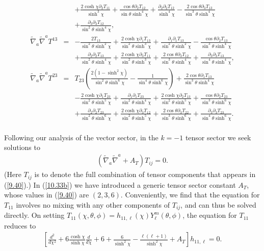 \begin{eqnarray}
 \nonumber\\
 &&+ \frac{2 \cosh\chi \partial_{2}T_{11}}{\sinh^3\chi}  + \frac{\cos\theta \partial_{2}T_{12}}{\sin\theta \sinh^4\chi} + \frac{\partial_{2}\partial_{2}T_{12}}{\sinh^4\chi}
 -  \frac{2 \cos\theta \partial_{3}T_{13}}{\sin^3\theta \sinh^4\chi}
 \nonumber\\
 && + \frac{\partial_{3}\partial_{3}T_{12}}{\sin^2\theta \sinh^4\chi},
\nonumber\\ 
\tilde{\nabla}_a\tilde{\nabla}^aT^{13}&=& - \frac{2 T_{13}}{\sin^2\theta \sinh^2\chi} + \frac{2 \cosh\chi \partial_{1}T_{13}}{\sin^2\theta \sinh^3\chi} + \frac{\partial_{1}\partial_{1}T_{13}}{\sin^2\theta \sinh^2\chi} -  \frac{\cos\theta \partial_{2}T_{13}}{\sin^3\theta \sinh^4\chi}
\nonumber\\
&& + \frac{\partial_{2}\partial_{2}T_{13}}{\sin^2\theta \sinh^4\chi}  + \frac{2 \cosh\chi \partial_{3}T_{11}}{\sin^2\theta \sinh^3\chi} + \frac{2 \cos\theta \partial_{3}T_{12}}{\sin^3\theta \sinh^4\chi} + \frac{\partial_{3}\partial_{3}T_{13}}{\sin^4\theta \sinh^4\chi},
\nonumber\\ 
\tilde{\nabla}_a\tilde{\nabla}^aT^{23}&=& T_{23} \left(\frac{2(1-\sinh^2\chi)}{\sin^2\theta\sinh^6\chi} -  \frac{1}{\sin^4\theta \sinh^6\chi}\right) + \frac{2 \cos\theta \partial_{1}T_{13}}{\sin^3\theta \sinh^4\chi} 
\nonumber\\
&&-  \frac{2 \cosh\chi \partial_{1}T_{23}}{\sin^2\theta \sinh^5\chi} + \frac{\partial_{1}\partial_{1}T_{23}}{\sin^2\theta \sinh^4\chi} + \frac{2 \cosh\chi \partial_{2}T_{13}}{\sin^2\theta \sinh^5\chi} + \frac{\cos\theta \partial_{2}T_{23}}{\sin^3\theta \sinh^6\chi} 
\nonumber\\
&&+ \frac{\partial_{2}\partial_{2}T_{23}}{\sin^2\theta \sinh^6\chi} + \frac{2 \cosh\chi \partial_{3}T_{12}}{\sin^2\theta \sinh^5\chi} + \frac{2 \cos\theta \partial_{3}T_{22}}{\sin^3\theta \sinh^6\chi} 
 + \frac{\partial_{3}\partial_{3}T_{23}}{\sin^4\theta \sinh^6\chi}.
 \nonumber\\
\label{10.32b}
\end{eqnarray}
%

Following our analysis of the vector sector, in the $k=-1$ tensor sector we seek solutions to
%
\begin{eqnarray}
(\tilde{\nabla}_a\tilde{\nabla}^a+A_T)T_{ij}=0.
\label{10.33b}
\end{eqnarray}
%
(Here $T_{ij}$ is to denote the full combination of  tensor components that appears in (\ref{9.40}).)  In (\ref{10.33b}) we have introduced a generic tensor sector constant $A_T$, whose values in (\ref{9.40})  are $(2,3,6)$.
Conveniently, we find that the equation for $T_{11}$ involves no mixing with any other components of $T_{ij}$, and can thus be solved directly. On setting $T_{11}(\chi,\theta,\phi)=h_{11,\ell}(\chi)Y_{\ell}^m(\theta,\phi)$, the equation for $T_{11}$ reduces to 
%
\begin{eqnarray}
\left[\frac{d^2}{d\chi^2}+6\frac{\cosh\chi}{ \sinh\chi}\frac{d }{d\chi}
+6+\frac{6 }{ \sinh^2\chi}-\frac{\ell(\ell+1)}{ \sinh^2\chi}+A_T\right]h_{11,\ell}=0.
\label{10.34b}
\end{eqnarray}
%

